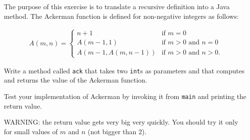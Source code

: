 \documentclass[12pt]{book}
\begin{document}
\begin{exercise}
The purpose of this exercise is to translate a recursive definition into a Java method.
The Ackerman function is defined for non-negative integers as follows:

\begin{eqnarray}
A(m, n) = \begin{cases}
              n+1 & \mbox{if } m = 0 \\
        A(m-1, 1) & \mbox{if } m > 0 \mbox{ and } n = 0 \\
A(m-1, A(m, n-1)) & \mbox{if } m > 0 \mbox{ and } n > 0.
\end{cases}
\end{eqnarray}

Write a method called {\tt ack} that takes two {\tt int}s as parameters and that computes and returns the value of the Ackerman function.

Test your implementation of Ackerman by invoking it from {\tt main} and printing the return value.

WARNING: the return value gets very big very quickly.
You should try it only for small values of $m$ and $n$ (not bigger than 2).
\end{exercise}
\end{document}
